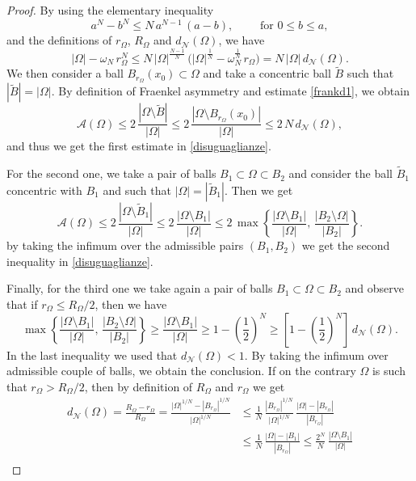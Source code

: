 \documentclass{amsart}
\theoremstyle{definition}
\numberwithin{equation}{section}
\begin{document}
\begin{proof}
By using the elementary inequality 
\[
a^N-b^N\le N\, a^{N-1}\,(a-b),\qquad \mbox{ for } 0\le b\le a, 
\]
and the definitions of $r_\Omega$, $R_\Omega$ and $d_\mathcal{N}(\Omega)$, we have
\begin{equation}
\label{frankd1}
|\Omega|-\omega_N\,r_\Omega^N\le N\, |\Omega|^\frac{N-1}{N}\,\Big(|\Omega|^\frac{1}{N}-\omega_N^\frac{1}{N}\,r_\Omega\Big)= N\, |\Omega|\, d_\mathcal{N}(\Omega).
\end{equation}
We then consider a ball $B_{r_\Omega}(x_0)\subset\Omega$ and take a concentric ball $\widetilde B$ such that $|\widetilde B|=|\Omega|$. By definition of Fraenkel asymmetry and estimate \eqref{frankd1}, we obtain
\[
\mathcal{A}(\Omega)\le 2\, \frac{|\Omega\setminus \widetilde B|}{|\Omega|}\le 2\, \frac{|\Omega\setminus B_{r_\Omega}(x_0)|}{|\Omega|}\le 2\,N\, d_\mathcal{N}(\Omega),
\]
and thus we get the first estimate in \eqref{disuguaglianze}.
\par
For the second one, we take a pair of balls $B_1\subset \Omega\subset B_2$ and consider the ball $\widetilde B_1$ concentric with $B_1$ and such that $|\Omega|=|\widetilde B_1|$. Then we get
\[
\mathcal{A}(\Omega)\le 2\, \frac{|\Omega\setminus \widetilde B_1|}{|\Omega|}\le 2\, \frac{|\Omega\setminus B_1|}{|\Omega|}\le 2\,\max\left\{\frac{|\Omega\setminus B_1|}{|\Omega|},\,\frac{|B_2\setminus \Omega|}{|B_2|}\right\}.
\] 
by taking the infimum over the admissible pairs $(B_1,B_2)$ we get the second inequality in \eqref{disuguaglianze}. 
\par
Finally, for the third one we take again a pair of balls $B_1\subset \Omega\subset B_2$ and observe that if $r_\Omega\le R_\Omega/2$, then  we have
\[
\max\left\{\frac{|\Omega\setminus B_1|}{|\Omega|},\,\frac{|B_2\setminus \Omega|}{|B_2|}\right\}\ge \frac{|\Omega\setminus B_1|}{|\Omega|}\ge 1-\left(\frac{1}{2}\right)^N\ge \left[1-\left(\frac{1}{2}\right)^N\right]\,d_\mathcal{N}(\Omega).
\]
In the last inequality we used that $d_\mathcal{N}(\Omega)<1$. By taking the infimum over admissible couple of balls, we obtain the conclusion. If on the contrary $\Omega$ is such that $r_\Omega> R_\Omega/2$, then 
by definition of $R_\Omega$ and $r_\Omega$ we get
\[
\begin{split}
d_\mathcal{N}(\Omega)=\frac{R_\Omega-r_\Omega}{R_\Omega}=\frac{|\Omega|^{1/N}-|B_{r_\Omega}|^{1/N}}{|\Omega|^{1/N}}&\le \frac{1}{N}\, \frac{|B_{r_\Omega}|^{1/N}}{|\Omega|^{1/N}}\,\frac{|\Omega|-|B_{r_\Omega}|}{|B_{r_\Omega}|}\\
&\le \frac{1}{N}\, \frac{|\Omega|-|B_1|}{|B_{r_\Omega}|}\le \frac{2^N}{N}\, \frac{|\Omega\setminus B_1|}{|\Omega|}\\

\end{split}\]
\end{proof}
\end{document}
